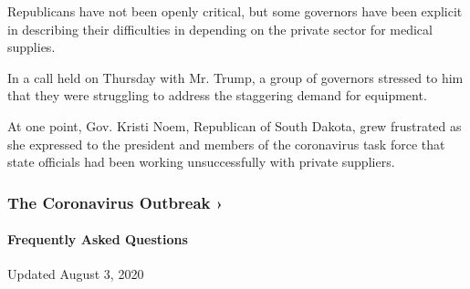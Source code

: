 Republicans have not been openly critical, but some governors have been
explicit in describing their difficulties in depending on the private
sector for medical supplies.

In a call held on Thursday with Mr. Trump, a group of governors stressed
to him that they were struggling to address the staggering demand for
equipment.

At one point, Gov. Kristi Noem, Republican of South Dakota, grew
frustrated as she expressed to the president and members of the
coronavirus task force that state officials had been working
unsuccessfully with private suppliers.

\href{https://www.nytimes.com/news-event/coronavirus?action=click\&pgtype=Article\&state=default\&region=MAIN_CONTENT_3\&context=storylines_faq}{}

\hypertarget{the-coronavirus-outbreak-}{%
\subsubsection{The Coronavirus Outbreak
›}\label{the-coronavirus-outbreak-}}

\hypertarget{frequently-asked-questions}{%
\paragraph{Frequently Asked
Questions}\label{frequently-asked-questions}}

Updated August 3, 2020

